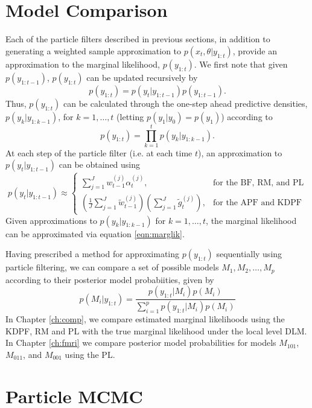 \section{Model Comparison \label{sec:comp}}

Each of the particle filters described in previous sections, in addition to generating a weighted sample approximation to $p(x_t,\theta|y_{1:t})$, provide an approximation to the marginal likelihood, $p(y_{1:t})$. We first note that given $p(y_{1:t-1})$, $p(y_{1:t})$ can be updated recursively by
\begin{equation}
p(y_{1:t}) = p(y_t|y_{1:t-1})p(y_{1:t-1}). \label{eqn:marglik:recurse}
\end{equation}
Thus, $p(y_{1:t})$ can be calculated through the one-step ahead predictive densities, $p(y_k|y_{1:k-1})$, for $k=1,\ldots,t$ (letting $p(y_1|y_0) = p(y_1)$) according to
\begin{equation}
p(y_{1:t}) = \prod_{k=1}^t p(y_k|y_{1:k-1}). \label{eqn:marglik}
\end{equation}
At each step of the particle filter (i.e. at each time $t$), an approximation to $p(y_t|y_{1:t-1})$ can be obtained using
\begin{equation}
p(y_t|y_{1:t-1}) \approx \left\{\begin{array}{ll} \sum_{j=1}^J w^{(j)}_{t-1}\alpha^{(j)}_t, & \mbox{for the BF, RM, and PL} \\ \left(\frac{1}{J}\sum_{j=1}^J \tilde{w}^{(j)}_{t-1}\right)\left(\sum_{j=1}^J\tilde{g}^{(j)}_t\right), & \mbox{for the APF and KDPF} \end{array} \right.\label{eqn:onestep:pf}
\end{equation}
Given approximations to $p(y_k|y_{1:k-1})$ for $k = 1,\ldots,t$, the marginal likelihood can be approximated via equation \eqref{eqn:marglik}. 

Having prescribed a method for approximating $p(y_{1:t})$ sequentially using particle filtering, we can compare a set of possible models ${M_1,M_2,\ldots,M_p}$ according to their posterior model probabiities, given by
\begin{equation}
p(M_i|y_{1:t}) = \frac{p(y_{1:t}|M_i)p(M_i)}{\sum_{i=1}^p p(y_{1:t}|M_i)p(M_i)} \label{eqn:modelcomp}
\end{equation}
In Chapter \ref{ch:comp}, we compare estimated marginal likelihoods using the KDPF, RM and PL with the true marginal likelihood under the local level DLM. In Chapter \ref{ch:fmri} we compare posterior model probabilities for models $M_{101}$, $M_{011}$, and $M_{001}$ using the PL.

\section{Particle MCMC \label{sec:pmcmc}} 